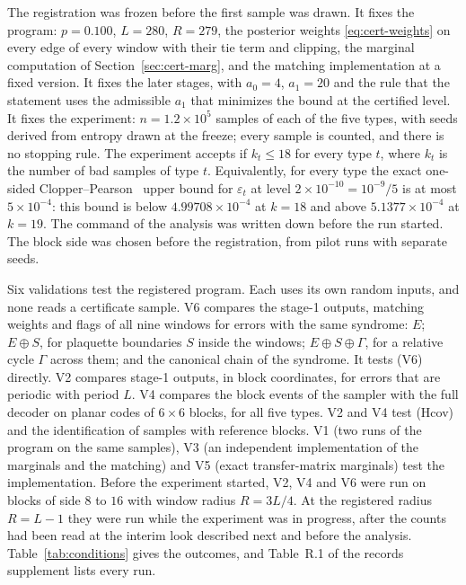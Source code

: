 \documentclass[11pt]{amsart}
\theoremstyle{definition}
\theoremstyle{remark}
\numberwithin{equation}{section}
\begin{document}
The registration was frozen before the first sample was drawn. It fixes the program: $p=0.100$, $L=280$, $R=279$, the posterior weights \eqref{eq:cert-weights} on every edge of every window with their tie term and clipping, the marginal computation of Section~\ref{sec:cert-marg}, and the matching implementation at a fixed version. It fixes the later stages, with $a_0=4$, $a_1=20$ and the rule that the statement uses the admissible $a_1$ that minimizes the bound at the certified level. It fixes the experiment: $n=1.2\times10^{5}$ samples of each of the five types, with seeds derived from entropy drawn at the freeze; every sample is counted, and there is no stopping rule. The experiment accepts if $k_t\le18$ for every type $t$, where $k_t$ is the number of bad samples of type $t$. Equivalently, for every type the exact one-sided Clopper--Pearson~\cite{CP34} upper bound for $\varepsilon_t$ at level $2\times10^{-10}=10^{-9}/5$ is at most $5\times10^{-4}$: this bound is below $4.99708\times10^{-4}$ at $k=18$ and above $5.1377\times10^{-4}$ at $k=19$. The command of the analysis was written down before the run started. The block side was chosen before the registration, from pilot runs with separate seeds.

Six validations test the registered program. Each uses its own random inputs, and none reads a certificate sample. V6 compares the stage-1 outputs, matching weights and flags of all nine windows for errors with the same syndrome: $E$; $E\oplus S$, for plaquette boundaries $S$ inside the windows; $E\oplus S\oplus\Gamma$, for a relative cycle $\Gamma$ across them; and the canonical chain of the syndrome. It tests (V6) directly. V2 compares stage-1 outputs, in block coordinates, for errors that are periodic with period $L$. V4 compares the block events of the sampler with the full decoder on planar codes of $6\times6$ blocks, for all five types. V2 and V4 test (Hcov) and the identification of samples with reference blocks. V1 (two runs of the program on the same samples), V3 (an independent implementation of the marginals and the matching) and V5 (exact transfer-matrix marginals) test the implementation. Before the experiment started, V2, V4 and V6 were run on blocks of side $8$ to $16$ with window radius $R=3L/4$. At the registered radius $R=L-1$ they were run while the experiment was in progress, after the counts had been read at the interim look described next and before the analysis. Table~\ref{tab:conditions} gives the outcomes, and Table~R.1 of the records supplement lists every run.
\end{document}

